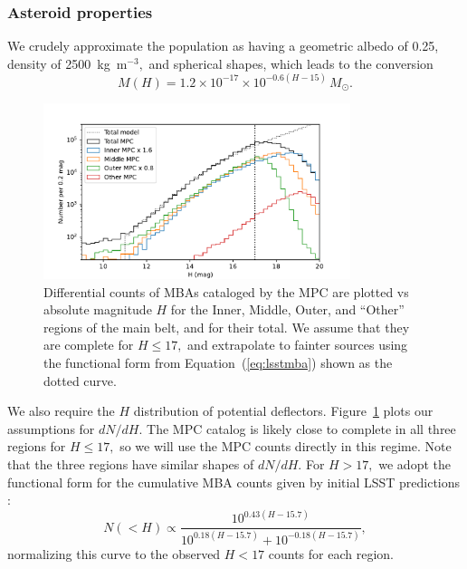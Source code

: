 \documentclass[linenumbers, onecolumn]{aastex631}
\newcommand{\eqq}[1]{Equation~(\ref{#1})}
\begin{document}
\subsubsection{Asteroid properties}
We crudely approximate the population as having a geometric albedo of 0.25,
density of 2500~kg~m$^{-3},$ and spherical shapes, which leads to the
conversion
\begin{equation}
  M(H) = 1.2\times10^{-17} \times 10^{-0.6(H-15)}\, M_\odot.
\end{equation}

\begin{figure}
  \centering
  \includegraphics[width=0.8\textwidth]{mbacounts.pdf}
  \caption{Differential counts of MBAs cataloged by the MPC are
    plotted vs absolute magnitude $H$  
    for the Inner, Middle, Outer, and ``Other'' regions of
    the main belt, and for their total.  We assume that they are
    complete for $H\le17,$ and extrapolate to fainter sources using
    the functional form from \eqq{eq:lsstmba} shown as the dotted
    curve.}
  \label{fig:counts}
\end{figure}
We also require the $H$ distribution of potential deflectors.
Figure~\ref{fig:counts} plots our assumptions for $dN/dH.$  The MPC
catalog is likely close to complete in all three regions for $H\le17,$
so we will use the MPC counts directly in this regime.  Note that the
three regions have similar shapes of $dN/dH.$  For $H>17,$ we adopt
the functional form for the cumulative MBA counts given by
initial LSST predictions \citep{LSST_science_book}:
\begin{equation}
  N(<H) \propto \frac{10^{0.43(H-15.7)}}{10^{0.18(H-15.7)} +
    10^{-0.18(H-15.7)}},
\label{eq:lsstmba}
\end{equation}
normalizing this curve to the observed $H<17$ counts for each region.
\end{document}
